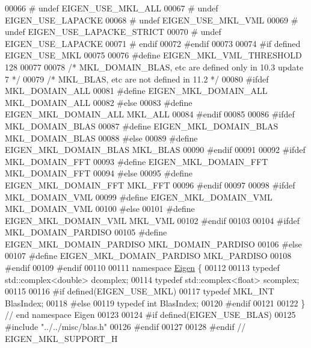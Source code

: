 \begin{DoxyCode}
00066 \textcolor{preprocessor}{#       undef   EIGEN\_USE\_MKL\_ALL}
00067 \textcolor{preprocessor}{#       undef   EIGEN\_USE\_LAPACKE}
00068 \textcolor{preprocessor}{#       undef   EIGEN\_USE\_MKL\_VML}
00069 \textcolor{preprocessor}{#       undef   EIGEN\_USE\_LAPACKE\_STRICT}
00070 \textcolor{preprocessor}{#       undef   EIGEN\_USE\_LAPACKE}
00071 \textcolor{preprocessor}{#   endif}
00072 \textcolor{preprocessor}{#endif}
00073 
00074 \textcolor{preprocessor}{#if defined EIGEN\_USE\_MKL}
00075 
00076 \textcolor{preprocessor}{#define EIGEN\_MKL\_VML\_THRESHOLD 128}
00077 
00078 \textcolor{comment}{/* MKL\_DOMAIN\_BLAS, etc are defined only in 10.3 update 7 */}
00079 \textcolor{comment}{/* MKL\_BLAS, etc are not defined in 11.2 */}
00080 \textcolor{preprocessor}{#ifdef MKL\_DOMAIN\_ALL}
00081 \textcolor{preprocessor}{#define EIGEN\_MKL\_DOMAIN\_ALL MKL\_DOMAIN\_ALL}
00082 \textcolor{preprocessor}{#else}
00083 \textcolor{preprocessor}{#define EIGEN\_MKL\_DOMAIN\_ALL MKL\_ALL}
00084 \textcolor{preprocessor}{#endif}
00085 
00086 \textcolor{preprocessor}{#ifdef MKL\_DOMAIN\_BLAS}
00087 \textcolor{preprocessor}{#define EIGEN\_MKL\_DOMAIN\_BLAS MKL\_DOMAIN\_BLAS}
00088 \textcolor{preprocessor}{#else}
00089 \textcolor{preprocessor}{#define EIGEN\_MKL\_DOMAIN\_BLAS MKL\_BLAS}
00090 \textcolor{preprocessor}{#endif}
00091 
00092 \textcolor{preprocessor}{#ifdef MKL\_DOMAIN\_FFT}
00093 \textcolor{preprocessor}{#define EIGEN\_MKL\_DOMAIN\_FFT MKL\_DOMAIN\_FFT}
00094 \textcolor{preprocessor}{#else}
00095 \textcolor{preprocessor}{#define EIGEN\_MKL\_DOMAIN\_FFT MKL\_FFT}
00096 \textcolor{preprocessor}{#endif}
00097 
00098 \textcolor{preprocessor}{#ifdef MKL\_DOMAIN\_VML}
00099 \textcolor{preprocessor}{#define EIGEN\_MKL\_DOMAIN\_VML MKL\_DOMAIN\_VML}
00100 \textcolor{preprocessor}{#else}
00101 \textcolor{preprocessor}{#define EIGEN\_MKL\_DOMAIN\_VML MKL\_VML}
00102 \textcolor{preprocessor}{#endif}
00103 
00104 \textcolor{preprocessor}{#ifdef MKL\_DOMAIN\_PARDISO}
00105 \textcolor{preprocessor}{#define EIGEN\_MKL\_DOMAIN\_PARDISO MKL\_DOMAIN\_PARDISO}
00106 \textcolor{preprocessor}{#else}
00107 \textcolor{preprocessor}{#define EIGEN\_MKL\_DOMAIN\_PARDISO MKL\_PARDISO}
00108 \textcolor{preprocessor}{#endif}
00109 \textcolor{preprocessor}{#endif}
00110 
00111 \textcolor{keyword}{namespace }\hyperlink{namespace_eigen}{Eigen} \{
00112 
00113 \textcolor{keyword}{typedef} std::complex<double> dcomplex;
00114 \textcolor{keyword}{typedef} std::complex<float>  scomplex;
00115 
00116 \textcolor{preprocessor}{#if defined(EIGEN\_USE\_MKL)}
00117 \textcolor{keyword}{typedef} MKL\_INT BlasIndex;
00118 \textcolor{preprocessor}{#else}
00119 \textcolor{keyword}{typedef} \textcolor{keywordtype}{int} BlasIndex;
00120 \textcolor{preprocessor}{#endif}
00121 
00122 \} \textcolor{comment}{// end namespace Eigen}
00123 
00124 \textcolor{preprocessor}{#if defined(EIGEN\_USE\_BLAS)}
00125 \textcolor{preprocessor}{#include "../../misc/blas.h"}
00126 \textcolor{preprocessor}{#endif}
00127 
00128 \textcolor{preprocessor}{#endif // EIGEN\_MKL\_SUPPORT\_H}
\end{DoxyCode}
